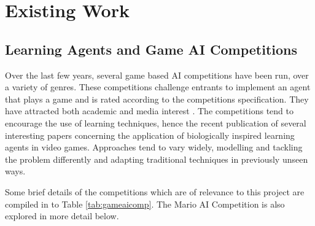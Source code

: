 
\section{Existing Work}


\subsection{Learning Agents and Game AI Competitions}
\label{subsec:gameaicomps}

Over the last few years, several game based AI competitions have been run, over a variety of genres. These competitions challenge entrants to implement an agent that plays a game and is rated according to the competitions specification. They have attracted both academic \cite[p.~2]{2012the} and media interest \cite[p.~2]{marioaicomp}. The competitions tend to encourage the use of learning techniques, hence the recent publication of several interesting papers concerning the application of biologically inspired learning agents in video games. Approaches tend to vary widely, modelling and tackling the problem differently and adapting traditional techniques in previously unseen ways. \cite[p.~11]{2012the}

Some brief details of the competitions which are of relevance to this project are compiled in to Table \ref{tab:gameaicomp}. The Mario AI Competition is also explored in more detail below.

